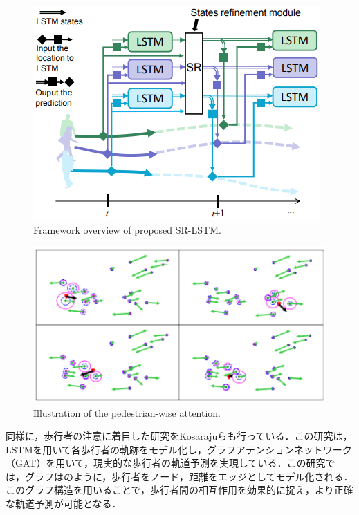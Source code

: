 
\begin{figure}[hbtp]
     \centering
    \includegraphics[keepaspectratio, scale=0.65]
         {images/sr-lstm-str.png}
    \caption{Framework overview of proposed SR-LSTM.\protect\footnotemark[2]}
    \label{Fig:sr-lstm-str}
\end{figure}

\begin{figure}[hbtp]
     \centering
    \includegraphics[keepaspectratio, scale=0.65]
         {images/sr-lstm.png}
    \caption{Illustration of the pedestrian-wise attention.\protect\footnotemark[2]}
    \label{Fig:sr-lstm}
\end{figure}

\protect{}

同様に，歩行者の注意に着目した研究をKosarajuら\cite{s-bigat}も行っている．この研究は，LSTMを用いて各歩行者の軌跡をモデル化し，グラフアテンションネットワーク（GAT）を用いて，現実的な歩行者の軌道予測を実現している．この研究では，グラフはのように，歩行者をノード，距離をエッジとしてモデル化される．このグラフ構造を用いることで，歩行者間の相互作用を効果的に捉え，より正確な軌道予測が可能となる．

